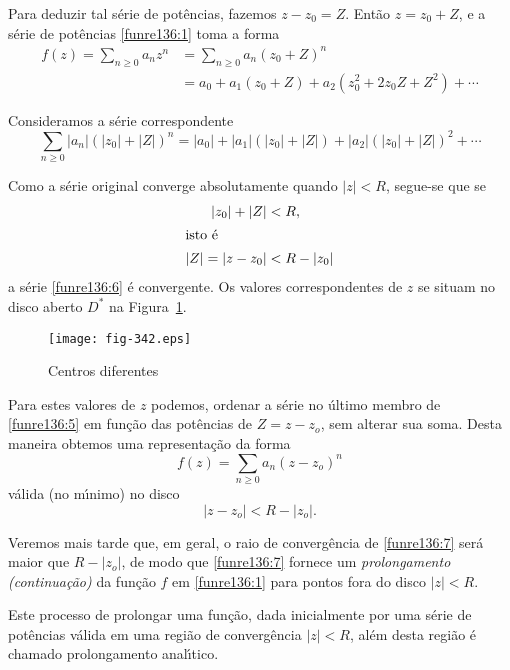 Para deduzir tal s\'{e}rie de pot\^{e}ncias, fazemos $z - z_{0}=Z$. Ent\~{a}o
$z=z_{0}+Z$, e a s\'{e}rie de pot\^{e}ncias \eqref{funre136:1} toma a forma
\begin{align}
  f(z) = \sum_{n\geq 0}a_nz^n &=\sum_{n\geq 0}a_n(z_{0}+Z)^n  \nonumber\\[2ex]
   &= a_{0}+a_1(z_{0}+Z)+a_2(z_{0}^2+2z_{0}Z+Z^{2})+\cdots \label{funre136:5}
\end{align}

Consideramos a s\'{e}rie correspondente
\begin{equation}\label{funre136:6}
\sum_{n\geq 0}|a_n|(|z_{0}|+|Z|)^n=|a_{0}|+|a_1|(|z_{0}|+|Z|)+|a_2|(|z_{0}|+|Z|)^2+\cdots
\end{equation}

Como a s\'{e}rie original converge absolutamente quando $|z|<R$,
segue-se que se
\begin{align*}
  |z_{0}|+|Z| & <R, \\
  \intertext{isto \'{e} }
  |Z|=|z-z_{0}|&<R-|z_{0}|
\end{align*}
a s\'{e}rie \eqref{funre136:6} \'{e} convergente. Os valores
correspondentes de $z$ se situam no disco aberto $D^{*}$ na
Figura~\ref{fig-342}.
\begin{figure}[H]
\centering
\texttt{[image: fig-342.eps]}
\caption{Centros diferentes}
\label{fig-342}
\end{figure}

Para estes valores de $z$ podemos, ordenar a s\'{e}rie no \'{u}ltimo
membro de \eqref{funre136:5} em fun\c{c}\~{a}o das pot\^{e}ncias de $Z =z -
z_o$, sem alterar sua soma. Desta maneira obtemos uma
representa\c{c}\~{a}o da forma
\begin{equation}\label{funre136:7}
  f(z)=\sum_{n\geq 0}a_n(z-z_o)^n
\end{equation}
v\'{a}lida (no m\'{\i}nimo) no disco
\begin{equation*}
  |z-z_o|<R-|z_o|.
\end{equation*}

Veremos mais tarde que, em geral, o raio de converg\^{e}ncia de
\eqref{funre136:7} ser\'{a} maior que $R- |z_o|$, de modo que
\eqref{funre136:7} fornece um \textit{prolongamento (continua\c{c}\~{a}o)}
da fun\c{c}\~{a}o $f$ em \eqref{funre136:1} para pontos fora do disco $|z|
< R$.

Este processo de prolongar uma fun\c{c}\~{a}o, dada inicialmente por uma
s\'{e}rie de pot\^{e}ncias v\'{a}lida em uma regi\~{a}o de converg\^{e}ncia $|z| < R$,
al\'{e}m desta regi\~{a}o \'{e} chamado prolongamento anal\'{\i}tico.

